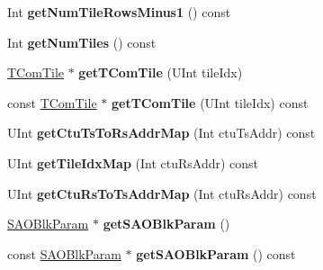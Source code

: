 \begin{DoxyCompactItemize}
\item 
\mbox{\label{class_t_com_pic_sym_ab4af1024574d2555c45adfd8808af90b}} 
Int {\bfseries get\+Num\+Tile\+Rows\+Minus1} () const
\item 
\mbox{\label{class_t_com_pic_sym_a13b5f6d378a5141759900c74db72b52c}} 
Int {\bfseries get\+Num\+Tiles} () const
\item 
\mbox{\label{class_t_com_pic_sym_a3f325f7818d5656f9ce55ea291fe228a}} 
\hyperlink{class_t_com_tile}{T\+Com\+Tile} $\ast$ {\bfseries get\+T\+Com\+Tile} (U\+Int tile\+Idx)
\item 
\mbox{\label{class_t_com_pic_sym_aad45eb3bf589ae0921fc407af81a8023}} 
const \hyperlink{class_t_com_tile}{T\+Com\+Tile} $\ast$ {\bfseries get\+T\+Com\+Tile} (U\+Int tile\+Idx) const
\item 
\mbox{\label{class_t_com_pic_sym_a4a9cdc6045eddb54a017e2436ad27401}} 
U\+Int {\bfseries get\+Ctu\+Ts\+To\+Rs\+Addr\+Map} (Int ctu\+Ts\+Addr) const
\item 
\mbox{\label{class_t_com_pic_sym_aec05ed683a071976b7e2f625ded82763}} 
U\+Int {\bfseries get\+Tile\+Idx\+Map} (Int ctu\+Rs\+Addr) const
\item 
\mbox{\label{class_t_com_pic_sym_a2ecd350b6896ef44ccc444cdf80fdd3c}} 
U\+Int {\bfseries get\+Ctu\+Rs\+To\+Ts\+Addr\+Map} (Int ctu\+Rs\+Addr) const
\item 
\mbox{\label{class_t_com_pic_sym_aad3058952269cbe5b97a00d507cf55c0}} 
\hyperlink{struct_s_a_o_blk_param}{S\+A\+O\+Blk\+Param} $\ast$ {\bfseries get\+S\+A\+O\+Blk\+Param} ()
\item 
\mbox{\label{class_t_com_pic_sym_a0a68af093d8ffcaecf23e71fb2643e00}} 
const \hyperlink{struct_s_a_o_blk_param}{S\+A\+O\+Blk\+Param} $\ast$ {\bfseries get\+S\+A\+O\+Blk\+Param} () const
\end{DoxyCompactItemize}
